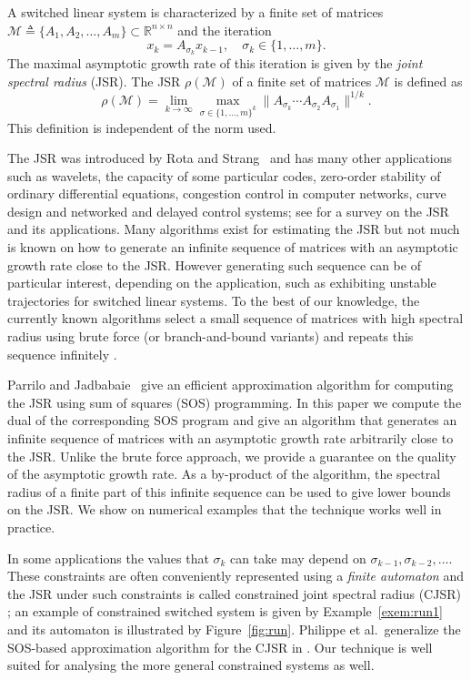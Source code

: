\documentclass{sig-alternate-05-2015}
\newcommand{\1}{\mathbf{1}}
\theoremstyle{definition}
\newcommand{\A}{\mathcal{M}}
\newcommand{\jsr}{\rho(\A)}
\newcommand{\Sect}{Section~}
\newcommand{\eqdef}{\triangleq}
\newcommand{\witch}{witched}
\begin{document}
A s\witch{} linear system is characterized by a finite set of matrices $\A \eqdef \{A_1, A_2, \ldots, A_m\} \subset \mathbb{R}^{n \times n}$ and the iteration
\[ x_k = A_{\sigma_k} x_{k-1}, \quad \sigma_k \in \{1, \ldots, m\}. \]
The maximal asymptotic growth rate of this iteration is given by the \emph{joint spectral radius} (JSR).
The JSR $\jsr$ of a finite set of matrices $\A$
is defined as
\[ \jsr = \lim_{k \to \infty} \max_{\sigma \in \{1, \ldots, m\}^k} \|A_{\sigma_k} \cdots A_{\sigma_2} A_{\sigma_1}\|^{1/k}. \]
This definition is independent of the norm used.

The JSR was introduced by Rota and Strang~\cite{rota1960note}
and has many other applications such as wavelets, the capacity of some particular codes, zero-order stability of ordinary differential equations, congestion control in computer networks, curve design and networked and delayed control systems; see \cite{jungers2009joint} for a survey on the JSR and its applications.
Many algorithms exist for estimating the JSR but not much is known on how to generate an infinite
sequence of matrices with an asymptotic growth rate close to the JSR.
However generating such sequence can be of particular interest, depending on the application,
such as exhibiting unstable trajectories for s\witch{} linear systems.
To the best of our knowledge,
the currently known algorithms select a small sequence of matrices with high spectral radius
using brute force (or branch-and-bound variants) and repeats this sequence infinitely \cite{gripenberg1996computing,guglielmi2008algorithm,jungers2014lifted}.

Parrilo and Jadbabaie~\cite{parrilo2008approximation} give an efficient approximation algorithm for computing the JSR using sum of squares (SOS) programming.
In this paper we compute the dual of the corresponding SOS program and
give an algorithm that generates an infinite sequence of matrices with
an asymptotic growth rate arbitrarily close to the JSR.
Unlike the brute force approach,
we provide a guarantee on the quality of the asymptotic growth rate.
As a by-product of the algorithm, the spectral radius of a finite part of
this infinite sequence can be used to give lower bounds on the JSR.
We show on numerical examples that the technique works well in practice.

In some applications the values that $\sigma_k$ can take may depend on $\sigma_{k-1}, \sigma_{k-2}, \ldots$.
These constraints are often conveniently represented using a \emph{finite automaton} and the JSR under such constraints
is called constrained joint spectral radius (CJSR) \cite{dai2012gel}; an example of constrained s\witch{} system is given by Example~\ref{exem:run1} and its automaton is illustrated by Figure~\ref{fig:run}.
Philippe et al.\  generalize the SOS-based approximation algorithm for the CJSR in \cite[\Sect3]{philippe2015stability}.
Our technique is well suited for analysing the more general constrained systems as well.
\end{document}
